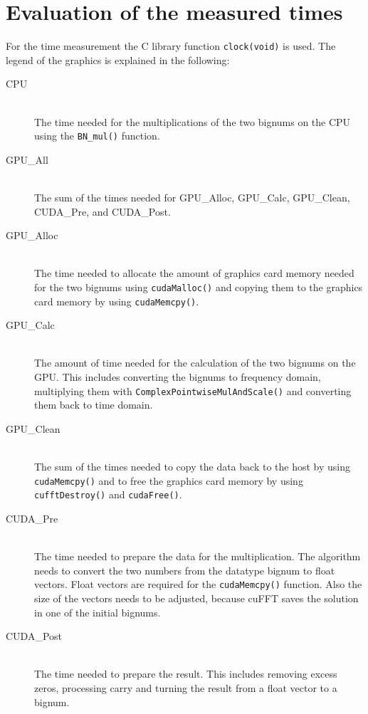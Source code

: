 \documentclass[12pt,a4paper]{article}
\begin{document}
\section{Evaluation of the measured times}
For the time measurement the C library function \texttt{clock(void)} is used. The legend of the graphics is explained in the following:
\begin{description}
\item[CPU]\hfill \\
The time needed for the multiplications of the two bignums on the CPU using the \texttt{BN_mul()} function.
\item[GPU\_All]\hfill \\ 
The sum of the times needed for GPU\_Alloc, GPU\_Calc, GPU\_Clean, CUDA\_Pre, and CUDA\_Post.
\item[GPU\_Alloc]\hfill \\ 
The time needed to allocate the amount of graphics card memory needed for the two bignums using \texttt{cudaMalloc()} and copying them to the graphics card memory by using \texttt{cudaMemcpy()}.
\item[GPU\_Calc]\hfill \\ 
The amount of time needed for the calculation of the two bignums on the GPU. This includes converting the bignums to frequency domain, multiplying them with \texttt{ComplexPointwiseMulAndScale()} and converting them back to time domain.
\item[GPU\_Clean]\hfill \\ 
The sum of the times needed to copy the data back to the host by using \texttt{cudaMemcpy()} and to free the graphics card memory by using \texttt{cufftDestroy()} and \texttt{cudaFree()}.
\item[CUDA\_Pre]\hfill \\ 
The time needed to prepare the data for the multiplication. The algorithm needs to convert the two numbers from the datatype bignum to float vectors. Float vectors are required for the \texttt{cudaMemcpy()} function. Also the size of the vectors needs to be adjusted, because cuFFT saves the solution in one of the initial bignums.
\item[CUDA\_Post]\hfill \\ 
The time needed to prepare the result. This includes removing excess zeros, processing carry and turning the result from a float vector to a bignum.
\end{description}
\end{document}
